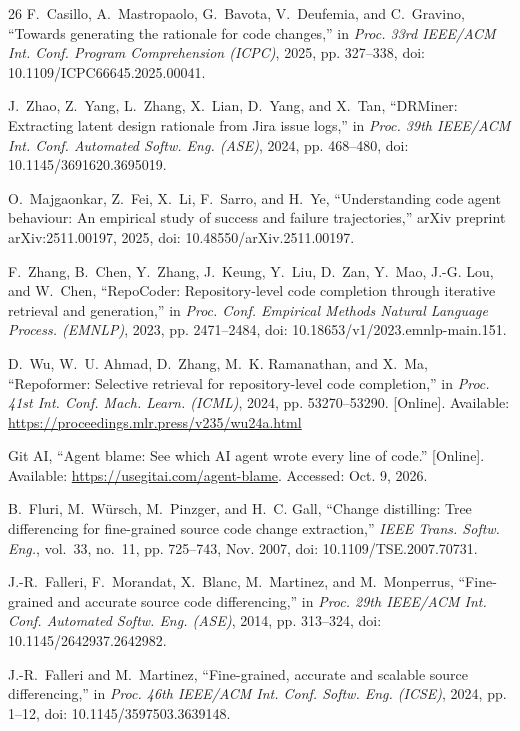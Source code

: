 \documentclass[10pt,conference]{IEEEtran}
\begin{document}
\begin{thebibliography}{26}
F.~Casillo, A.~Mastropaolo, G.~Bavota, V.~Deufemia, and C.~Gravino, ``Towards generating the rationale for code changes,'' in \emph{Proc. 33rd IEEE/ACM Int. Conf. Program Comprehension (ICPC)}, 2025, pp. 327--338, doi: 10.1109/ICPC66645.2025.00041.

J.~Zhao, Z.~Yang, L.~Zhang, X.~Lian, D.~Yang, and X.~Tan, ``DRMiner: Extracting latent design rationale from Jira issue logs,'' in \emph{Proc. 39th IEEE/ACM Int. Conf. Automated Softw. Eng. (ASE)}, 2024, pp. 468--480, doi: 10.1145/3691620.3695019.

O.~Majgaonkar, Z.~Fei, X.~Li, F.~Sarro, and H.~Ye, ``Understanding code agent behaviour: An empirical study of success and failure trajectories,'' arXiv preprint arXiv:2511.00197, 2025, doi: 10.48550/arXiv.2511.00197.

F.~Zhang, B.~Chen, Y.~Zhang, J.~Keung, Y.~Liu, D.~Zan, Y.~Mao, J.-G. Lou, and W.~Chen, ``RepoCoder: Repository-level code completion through iterative retrieval and generation,'' in \emph{Proc. Conf. Empirical Methods Natural Language Process. (EMNLP)}, 2023, pp. 2471--2484, doi: 10.18653/v1/2023.emnlp-main.151.

D.~Wu, W.~U. Ahmad, D.~Zhang, M.~K. Ramanathan, and X.~Ma, ``Repoformer: Selective retrieval for repository-level code completion,'' in \emph{Proc. 41st Int. Conf. Mach. Learn. (ICML)}, 2024, pp. 53270--53290. [Online]. Available: \url{https://proceedings.mlr.press/v235/wu24a.html}

Git AI, ``Agent blame: See which AI agent wrote every line of code.'' [Online]. Available: \url{https://usegitai.com/agent-blame}. Accessed: Oct. 9, 2026.

B.~Fluri, M.~W\"ursch, M.~Pinzger, and H.~C. Gall, ``Change distilling: Tree differencing for fine-grained source code change extraction,'' \emph{IEEE Trans. Softw. Eng.}, vol.~33, no.~11, pp. 725--743, Nov. 2007, doi: 10.1109/TSE.2007.70731.

J.-R.~Falleri, F.~Morandat, X.~Blanc, M.~Martinez, and M.~Monperrus, ``Fine-grained and accurate source code differencing,'' in \emph{Proc. 29th IEEE/ACM Int. Conf. Automated Softw. Eng. (ASE)}, 2014, pp. 313--324, doi: 10.1145/2642937.2642982.

J.-R.~Falleri and M.~Martinez, ``Fine-grained, accurate and scalable source differencing,'' in \emph{Proc. 46th IEEE/ACM Int. Conf. Softw. Eng. (ICSE)}, 2024, pp. 1--12, doi: 10.1145/3597503.3639148.


\end{thebibliography}
\end{document}
